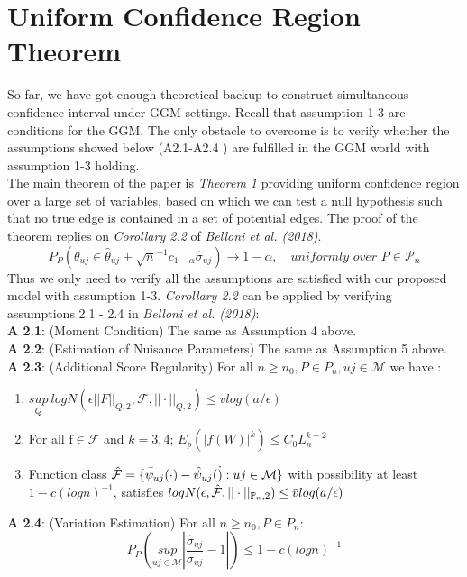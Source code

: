 \documentclass{article}
\begin{document}
\section{Uniform Confidence Region Theorem}


\noindent So far, we have got enough theoretical backup to construct simultaneous confidence interval under GGM settings. Recall that assumption 1-3 are conditions for the GGM. The only obstacle to overcome is to verify whether the assumptions showed below (A2.1-A2.4 ) are fulfilled in the GGM world with assumption 1-3 holding.\\
The main theorem of the paper is \textit{Theorem 1} providing uniform confidence region over a large set of variables, based on which we can test a null hypothesis such that no true edge is contained in a set of potential edges. The proof of the theorem replies on \textit{Corollary 2.2} of \textit{Belloni et al. (2018)}\cite{Belloni_2018}. 
\[
P_P(\theta_{uj} \in \hat{\theta}_{uj} \pm \sqrt{n}^{-1}c_{1-\alpha}\hat{\sigma}_{uj}) \longrightarrow 1-\alpha, \quad \textit{uniformly over $P\in \mathcal{P}_n$}
\]
Thus we only need to verify all the assumptions are satisfied with our proposed model with assumption 1-3. 
\textit{Corollary 2.2} can be applied by verifying assumptions 2.1 - 2.4 in \textit{Belloni et al. (2018)}:\\
\textbf{A 2.1}: (Moment Condition) The same as Assumption 4 above.\\
\textbf{A 2.2}: (Estimation of Nuisance Parameters) The same as Assumption 5 above. \\
\textbf{A 2.3}: (Additional Score Regularity) For all $n\geq n_0, P\in P_n, uj\in\mathcal{M}$ we have :
    \begin{enumerate}
        \item $\underset{Q}{sup} \: log N(\epsilon||F||_{Q,2},\mathcal{F},||\cdot||_{Q,2})\leq v log(a/\epsilon)$
        \item For all $\mathrm{f} \in \mathcal{F}$ and $k = 3, 4$; $E_p(|f(W)|^k) \leq C_0 L^{k-2}_{n}$
        \item Function class $\hat{\mathcal{F}} = \{\Bar{\psi}_{uj}(\cdot)-\hat{\psi}_{uj}(\dot):uj\in\mathcal{M} \}$ with possibility at least $1-c(logn)^{-1}$, satisfies $ log N(\epsilon,\hat{\mathcal{F}},||\cdot||_{\mathbb{P}_n,2})\leq \Bar{v} log(a/\epsilon)$
    \end{enumerate}
\textbf{A 2.4}: (Variation Estimation) For all $n\geq n_0, P\in P_n$:
\[
P_P( \underset{uj\in\mathcal{M}}{sup} |\frac{\hat{\sigma}_{uj}}{\sigma_{uj}} - 1| ) \leq 1-c(logn)^{-1}
\]
\end{document}
